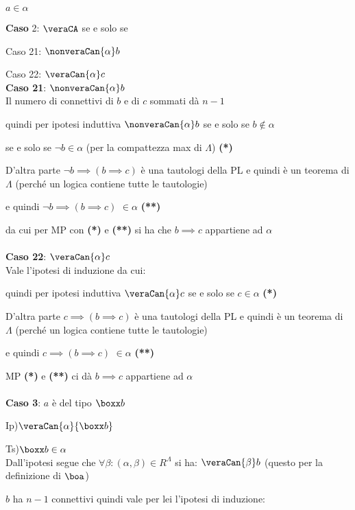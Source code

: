 $a\in\alpha$ 

\textbf{Caso} 2:$ $ $\veraCA$ se e solo se

Caso 21: $\nonveraCan{\alpha}b$ 

Caso 22: $\veraCan{\alpha}c$\\


\textbf{Caso 21}: $\nonveraCan{\alpha}b$ \\


Il numero di connettivi di $b$ e di $c$ sommati dà $n-1$

quindi per ipotesi induttiva $\nonveraCan{\alpha}b$ se e solo se
$b\notin\alpha$ 

se e solo se $\neg b\in\alpha$ (per la compattezza max di $\Lambda$)
\textbf{({*})}

D'altra parte $\neg b\implies(b\implies c)$ è una tautologi della
PL e quindi è un teorema di $\Lambda$ (perché un logica contiene
tutte le tautologie)

e quindi $\neg b\implies(b\implies c)$ $\in\alpha$ \textbf{({*}{*})}

da cui per MP con \textbf{({*})} e \textbf{({*}{*})} si ha che $b\implies c$
appartiene ad $\alpha$\\
\\
\textbf{Caso 22}: $\veraCan{\alpha}c$\\


Vale l'ipotesi di induzione da cui:

quindi per ipotesi induttiva $\veraCan{\alpha}c$ se e solo se $c\in\alpha$
\textbf{({*})}

D'altra parte $c\implies(b\implies c)$ è una tautologi della PL e
quindi è un teorema di $\Lambda$ (perché un logica contiene tutte
le tautologie)

e quindi $c\implies(b\implies c)$ $\in\alpha$ \textbf{({*}{*})}

MP \textbf{({*}) }e \textbf{({*}{*}) }ci dà $b\implies c$ appartiene
ad $\alpha$\\
\\
\textbf{Caso 3}: $a$ è del tipo $\boxx b$

Ip)$\veraCan{\alpha}{\boxx b}$

Ts)$\boxx b\in\alpha$\\


Dall'ipotesi segue che $\forall\beta:(\alpha,\beta)\in R^{\Lambda}$
si ha: $\veraCan{\beta}b$ (questo per la definizione di $\boa$)

$b$ ha $n-1$ connettivi quindi vale per lei l'ipotesi di induzione: 


